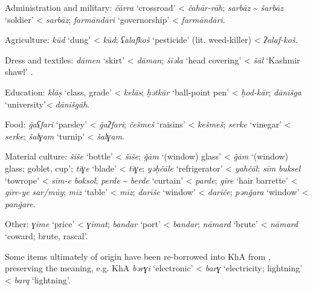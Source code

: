 \documentclass[output=paper,nonflat]{langsci/langscibook}
\begin{document}
\begin{altdescription} 
\item[Administration and military:] \textit{čārra} ‘crossroad’ <  \textit{čahār-rāh}; \textit{sarbāz} \~{} \textit{šarbāz} ‘soldier’ <  \textit{sarbāz}; \textit{farmāndāri} ‘governorship’ <  \textit{farmān\-dāri}.
\item[Agriculture:] \textit{kūd} ‘dung’ <  \textit{kūd}; \textit{ʕalafkoš} ‘pesticide' (lit. weed-killer) <  \textit{ʔalaf-koš}. 
\item[Dress and textiles:] \textit{dāmen} ‘skirt’ <  \textit{dāman}; \textit{šīəla} ‘head covering’ <  \textit{šāl} ‘Kashmir shawl’ \citep[174]{Ingham2005}.
\item[Education:] \textit{klāṣ} ‘class, grade’ <  \textit{kelās}; \textit{ḫətkār} ‘ball-point pen’ <  \textit{ḫod-kār}; \textit{dānišga} ‘university’\textit{<}  \textit{dānišgāh}.
\item[Food:] \textit{ǧaʕfari} ‘parsley’ <  \textit{ǧaʔfari}; \textit{češmeš} ‘raisins’ <  \textit{kešmeš}; \textit{serke} ‘vinegar’ <  \textit{serke}; \textit{šalɣam} ‘turnip’ <  \textit{šalɣam}.
\item[Material culture:] \textit{šīše} ‘bottle’ <  \textit{šīše}; \textit{ǧām} ‘(window) glass’ <  \textit{ǧām} ‘(window) glass; goblet, cup'; \textit{tīɣe} ‘blade’ <  \textit{tīɣe}; \textit{yəḫčāle} ‘refrigerator’ <  \textit{yahčāl}; \textit{sīm} \textit{buksel} ‘towrope’ <  \textit{sīm-e} \textit{boksol}; \textit{perde} \~{} \textit{berde} ‘curtain’ < \textit{parde}; \textit{gīre} ‘hair barrette’ <  \textit{gīre-ye} \textit{sar/mūy}; \textit{mīz} ‘table’ <  \textit{mīz}; \textit{darīše} ‘window’ <  \textit{darīče}; \textit{pənǧara} ‘window’ <  \textit{panǧare}.
\item[Other:] \textit{ɣīme} ‘price’ <  \textit{ɣīmat}; \textit{bandar} ‘port’ <  \textit{bandar}; \textit{nāmard} ‘brute’ <  \textit{nāmard} `coward; brute, rascal'.
\end{altdescription}

Some items ultimately of  origin have been re-borrowed into KhA from , preserving the  meaning, e.g. KhA \textit{bərɣi} ‘electronic’ <  \textit{barɣ} ‘electricity; lightning’ <  \textit{barq} ‘lightning’. 
\end{document}
